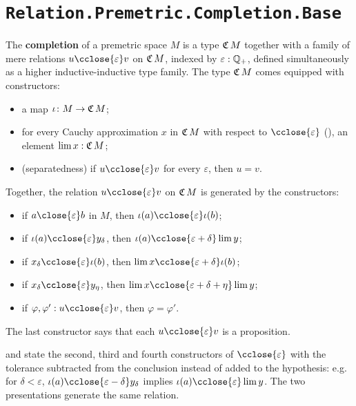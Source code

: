 \section{\texttt{Relation.Premetric.Completion.Base}}

\begin{definition}
  \label{completion}
  The \textbf{completion} of a premetric space $M$ is a type $\mathfrak{C}\,M$ together with a family of mere relations $u \cclose{\varepsilon} v$ on $\mathfrak{C}\,M$, indexed by $\varepsilon : \mathbb{Q}_{+}$, defined simultaneously as a higher inductive-inductive type family. The type $\mathfrak{C}\,M$ comes equipped with constructors:
  \begin{itemize}
  \item a map $\iota \colon M \to \mathfrak{C}\,M$;
  \item for every Cauchy approximation $x$ in $\mathfrak{C}\,M$ with respect to $\cclose{\varepsilon}$ (), an element $\lim x : \mathfrak{C}\,M$;
  \item (separatedness) if $u \cclose{\varepsilon} v$ for every $\varepsilon$, then $u = v$.
  \end{itemize}
  Together, the relation $u \cclose{\varepsilon} v$ on $\mathfrak{C}\,M$ is generated by the constructors:
  \begin{itemize}
  \item if $a \close{\varepsilon} b$ in $M$, then $\iota(a) \cclose{\varepsilon} \iota(b)$;
  \item if $\iota(a) \cclose{\varepsilon} y_\delta$, then $\iota(a) \cclose{\varepsilon + \delta} \lim y$;
  \item if $x_\delta \cclose{\varepsilon} \iota(b)$, then $\lim x \cclose{\varepsilon + \delta} \iota(b)$;
  \item if $x_\delta \cclose{\varepsilon} y_\eta$, then $\lim x \cclose{\varepsilon + \delta + \eta} \lim y$;
  \item if $\varphi, \varphi' : u \cclose{\varepsilon} v$, then $\varphi = \varphi'$.
  \end{itemize}
  The last constructor says that each $u \cclose{\varepsilon} v$ is a proposition.
\end{definition}

\textcite[Definition 3.1]{gilbert2017} and \textcite[Definition 11.3.2]{univalentfoundationsprogram2013} state the second, third and fourth constructors of $\cclose{\varepsilon}$ with the tolerance subtracted from the conclusion instead of added to the hypothesis: e.g. for $\delta < \varepsilon$, $\iota(a) \cclose{\varepsilon - \delta} y_\delta$ implies $\iota(a) \cclose{\varepsilon} \lim y$. The two presentations generate the same relation.
